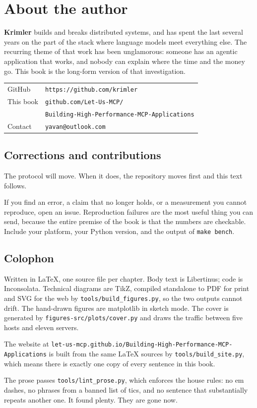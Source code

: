 \chapter*{About the author}

\textbf{Krimler} builds and breaks distributed systems, and has spent the last
several years on the part of the stack where language models meet everything
else. The recurring theme of that work has been unglamorous: someone has an
agentic application that works, and nobody can explain where the time and the
money go. This book is the long-form version of that investigation.

\vspace{10pt}
\noindent
\begin{tabular}{@{}ll@{}}
\sffamily\small GitHub & \texttt{https://github.com/krimler} \\
\sffamily\small This book & \texttt{github.com/Let-Us-MCP/} \\
 & \texttt{Building-High-Performance-MCP-Applications} \\
\sffamily\small Contact & \texttt{yavan@outlook.com} \\
\end{tabular}

\vspace{24pt}
\section*{Corrections and contributions}

The protocol will move. When it does, the repository moves first and this text
follows.

If you find an error, a claim that no longer holds, or a measurement you cannot
reproduce, open an issue. Reproduction failures are the most useful thing you
can send, because the entire premise of the book is that the numbers are
checkable. Include your platform, your Python version, and the output of
\texttt{make bench}.

\vspace{24pt}
\section*{Colophon}

Written in \LaTeX{}, one source file per chapter. Body text is Libertinus;
code is Inconsolata. Technical diagrams are TikZ, compiled standalone to PDF
for print and SVG for the web by \texttt{tools/build\_figures.py}, so the two
outputs cannot drift. The hand-drawn figures are matplotlib in sketch mode. The
cover is generated by \texttt{figures-src/plots/cover.py} and draws the traffic
between five hosts and eleven servers.

The website at \texttt{let-us-mcp.github.io/Building-High-Performance-MCP-Applications} is built
from the same LaTeX sources by \texttt{tools/build\_site.py}, which means there
is exactly one copy of every sentence in this book.

The prose passes \texttt{tools/lint\_prose.py}, which enforces the house rules:
no em dashes, no phrases from a banned list of tics, and no sentence that
substantially repeats another one. It found plenty. They are gone now.

